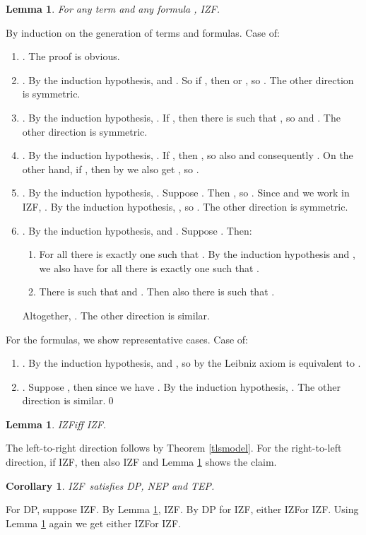 \documentclass{LMCS}
\newtheorem{corollary}[thm]{Corollary}
\newtheorem{lemma}[thm]{Lemma}
\newcommand{\izfr}{IZF}
\newcommand{\iizf}{IZF}
\begin{document}
\begin{lemma}\label{tt}
For any term  and any formula , \izfr .
\end{lemma}
\proof By induction on the generation of terms and formulas. 
Case  of:
\begin{enumerate}[]
\item . The proof is obvious. 
\item . By the induction hypothesis,  and
. So if , then  or , so 
. The other direction is symmetric.
\item . By the induction hypothesis, . If , then there is
 such that , so  and .
The other direction is symmetric.
\item . By the induction hypothesis, . If , 
then , so also  and consequently . 
On the other hand, if , then by  we also get , so . 
\item . By the induction hypothesis,
. Suppose . Then , so . Since 
 and we work in \izfr, . By the
induction hypothesis, , so . The other direction is symmetric. 
\item . By the induction hypothesis,  and . Suppose . Then:
\begin{enumerate}[]
\item For all  there is exactly one  such that . By the induction hypothesis and , we also have for all 
there is exactly one  such that .  
\item There is  such that  and . Then also there is  such that .
\end{enumerate}
Altogether, . The other direction is
similar. 
\end{enumerate}
For the formulas, we show representative cases. Case  of:
\begin{enumerate}[]
\item . By the induction hypothesis,  and , so by the Leibniz axiom  is equivalent to .
\item . Suppose , then since  we
have . By the induction hypothesis, . The other direction is similar.\qed
\end{enumerate}


\begin{lemma}\label{liff}
\izfr  iff \iizf . 
\end{lemma}
\proof The left-to-right direction follows by Theorem \ref{tlsmodel}. For the
right-to-left direction, if \iizf , then also \izfr 
and Lemma \ref{tt} shows the claim.\proof


\begin{corollary}\label{dpnep}
\izfr\ satisfies DP, NEP and  TEP. 
\end{corollary}
\proof For DP, suppose \izfr . By Lemma \ref{liff},
\iizf . By DP for \iizf, either \iizf  or
\iizf . Using Lemma \ref{liff} again we get either \izfr  or
\izfr .
\end{document}
